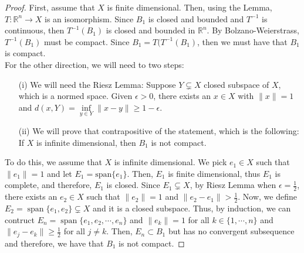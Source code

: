 \documentclass[12pt]{article}
\newcommand{\R}{{\mathbb R}}
\newcommand{\sbs}{\subset}
\DeclareMathOperator*{\spa}{span}
\begin{document}
\begin{proof}
First, assume that $X$ is finite dimensional. Then, using the Lemma, $T: \R^n \to X$ is an isomorphism. Since $B_1$ is closed and bounded and $T^{-1}$ is continuous, then $T^{-1}(B_1)$ is closed and bounded in $\R^n$. By Bolzano-Weierstrass, $T^{-1}(B_1)$ must be compact. Since $B_1 = T(T^{-1}(B_1)$, then we must have that $B_1$ is compact. \\
For the other direction, we will need to two steps:
\begin{enumerate}[topsep=-15pt, itemsep=0pt]
\item[(i)] We will need the Riesz Lemma: Suppose $Y \subsetneq X$ closed subspace of $X$, which is a normed space. Given $\epsilon >0$, there exists an $x \in X$ with $\| x \| = 1$ and $d(x, Y) = \inf\limits_{y \in Y} \| x - y \| \geq 1 - \epsilon$. 
\item[(ii)] We will prove that contrapositive of the statement, which is the following: If $X$ is infinite dimensional, then $B_1$ is not compact. 
\end{enumerate}
To do this, we assume that $X$ is infinite dimensional. We pick $e_1 \in X$ such that $\| e_1 \| = 1$ and let $E_1 = \text{span}\{ e_1 \}$. Then, $E_1$ is finite dimensional, thus $E_1$ is complete, and therefore, $E_1$ is closed. Since $E_1 \subsetneq X$, by Riesz Lemma when $\epsilon = \frac{1}{2}$, there exists an $e_2 \in X$ such that $\| e_2 \| = 1$ and $\| e_2 - e_1 \| > \frac{1}{2}$. Now, we define $E_2 = \spa\{ e_1, e_2\} \subsetneq X$ and it is a closed subspace. Thus, by induction, we can contruct $E_n = \spa\{ e_1, e_2, \cdots, e_n \}$ and $\| e_k \| = 1$ for all $k \in \{ 1, \cdots, n \}$ and $\| e_j - e_k \| \geq \frac{1}{2}$ for all $j \neq k$. Then, $E_n \sbs B_1$ but has no convergent subsequence and therefore, we have that $B_1$ is not compact. 
\end{proof}
\end{document}
